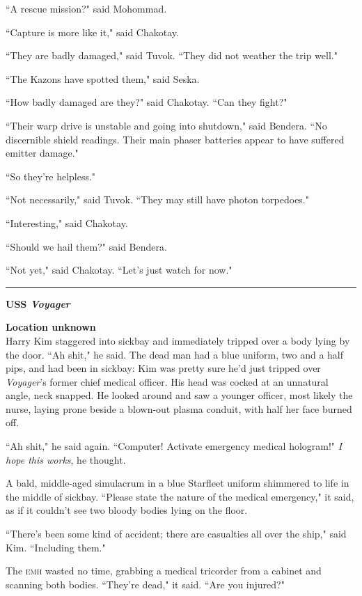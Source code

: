 \documentclass[twoside,letterpaper,12pt]{memoir}
\begin{document}
``A rescue mission?" said Mohommad.

``Capture is more like it," said Chakotay.

``They are badly damaged," said Tuvok. ``They did not weather the trip well."

``The Kazons have spotted them," said Seska.

``How badly damaged are they?" said Chakotay. ``Can they fight?"

``Their warp drive is unstable and going into shutdown," said Bendera. ``No discernible shield readings. Their main phaser batteries appear to have suffered emitter damage."

``So they're helpless."

``Not necessarily," said Tuvok. ``They may still have photon torpedoes."

``Interesting," said Chakotay.

``Should we hail them?" said Bendera.

``Not yet," said Chakotay. ``Let's just watch for now."

\fancybreak{\rule{3cm}{0.4 pt}}
\noindent\textbf{USS \textit{Voyager}}

\noindent\textbf{Location unknown}\\

Harry Kim staggered into sickbay and immediately tripped over a body lying by the door. ``Ah shit," he said. The dead man had a blue uniform, two and a half pips, and had been in sickbay: Kim was pretty sure he'd just tripped over \textit{Voyager}'s former chief medical officer. His head was cocked at an unnatural angle, neck snapped. He looked around and saw a younger officer, most likely the nurse, laying prone beside a blown-out plasma conduit, with half her face burned off.

``Ah shit," he said again. ``Computer! Activate emergency medical hologram!" \textit{I hope this works}, he thought.

A bald, middle-aged simulacrum in a blue Starfleet uniform shimmered to life in the middle of sickbay. ``Please state the nature of the medical emergency," it said, as if it couldn't see two bloody bodies lying on the floor.

``There's been some kind of accident; there are casualties all over the ship," said Kim. ``Including them."

The \textsc{emh} wasted no time, grabbing a medical tricorder from a cabinet and scanning both bodies. ``They're dead," it said. ``Are you injured?"
\end{document}
